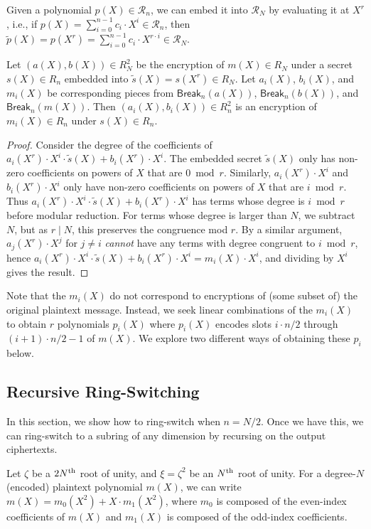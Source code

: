 \documentclass[../fheimpl.tex]{subfiles}
\begin{document}
	Given a polynomial $p(X)\in \mathcal{R}_n$, we can embed it into $\mathcal{R}_N$ by evaluating it at $X^r$, i.e., if $p(X)=\sum_{i=0}^{n-1} c_i\cdot X^i \in \mathcal{R}_n$, then $\tilde{p}(X)=p(X^r) = \sum_{i=0}^{n-1}c_i\cdot X^{r\cdot i}\in \mathcal{R}_N$.
	
	\begin{lemma}
		\label{lem:ctbreak}
		Let $(a(X), b(X))\in R_N^2$ be the encryption of $m(X)\in R_N$ under a secret $s(X)\in R_n$ embedded into $\tilde{s}(X)=s(X^r)\in R_N$. Let $a_i(X)$, $b_i(X)$, and $m_i(X)$ be corresponding pieces from $\mathsf{Break}_n(a(X))$, $\mathsf{Break}_n(b(X))$, and $\mathsf{Break}_n(m(X))$. Then $(a_i(X), b_i(X))\in R_n^2$ is an encryption of $m_i(X)\in R_n$ under $s(X)\in R_n$.
	\end{lemma}
	\begin{proof}
		 Consider the degree of the coefficients of $a_i(X^r)\cdot X^i\cdot \tilde{s}(X)+b_i(X^r)\cdot X^i$. The embedded secret $\tilde{s}(X)$ only has non-zero coefficients on powers of $X$ that are $0\bmod r$. Similarly, $a_i(X^r)\cdot X^i$ and $b_i(X^r)\cdot X^i$ only have non-zero coefficients on powers of $X$ that are $i\bmod r$. Thus $a_i(X^r)\cdot X^i \cdot \tilde{s}(X) + b_i(X^r)\cdot X^i$ has terms whose degree is $i\bmod r$ before modular reduction. For terms whose degree is larger than $N$, we subtract $N$, but as $r\mid N$, this preserves the congruence mod $r$. By a similar argument, $a_j(X^r)\cdot X^j$ for $j\ne i$ \emph{cannot} have any terms with degree congruent to $i\bmod r$, hence $a_i(X^r)\cdot X^i \cdot \tilde{s}(X) + b_i(X^r)\cdot X^i = m_i(X)\cdot X^i$, and dividing by $X^i$ gives the result.
	\end{proof}
	
	Note that the $m_i(X)$ do not correspond to encryptions of (some subset of) the original plaintext message. Instead, we seek linear combinations of the $m_i(X)$ to obtain $r$ polynomials $p_i(X)$ where $p_i(X)$ encodes slots $i\cdot n/2$ through $(i+1)\cdot n/2-1$ of $m(X)$. We explore two different ways of obtaining these $p_i$ below.	
	
	\subsection{Recursive Ring-Switching}
	In this section, we show how to ring-switch when $n=N/2$. Once we have this, we can ring-switch to a subring of any dimension by recursing on the output ciphertexts.
	
	Let $\zeta$ be a $2N^{\mathrm{th}}$ root of unity, and $\xi=\zeta^2$ be an $N^{\mathrm{th}}$ root of unity. For a degree-$N$ (encoded) plaintext polynomial $m(X)$, we can write $m(X)=m_0(X^2) + X\cdot m_1(X^2)$, where $m_0$ is composed of the even-index coefficients of $m(X)$ and $m_1(X)$ is composed of the odd-index coefficients. 
	
\end{document}
